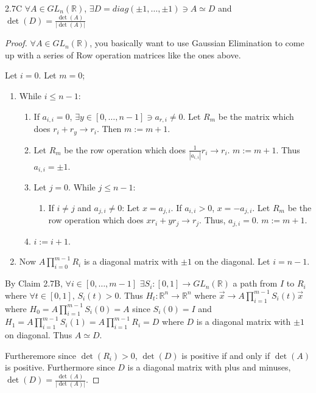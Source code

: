 \documentclass{article}
\newcommand{\R}{\mathbb{R}}
\newcommand{\abs}[1]{\left\lvert #1\right\rvert}
\begin{document}
\begin{claim}{2.7C}\label{Claim 2.7C.}
    $\forall A \in GL_n(\R)$, $\exists D = diag(\pm 1, \dots, \pm 1) \ni A \simeq D$ and $\det(D) = \frac{\det(A)}{\abs{\det(A)}}$    
\end{claim}
\begin{proof}
    $\forall A \in GL_n(\R)$, you basically want to use Gaussian Elimination to come up with a series of Row operation matrices like the ones above. 
    
    Let $i = 0$. Let $m = 0$;  
    
    \begin{enumerate}
        \item While $i \leq n - 1$:
        \begin{enumerate}
            \item If $a_{i, i} = 0$, $\exists y \in [0, \dots, n - 1] \ni a_{r, i} \neq 0$. Let $R_m$ be the matrix which does $r_{i} + r_{y} \to r_i$. Then $m := m + 1$.
            \item Let $R_m$ be the row operation which does $\frac{1}{\abs{a_{i , i}}} r_i \to r_i$. $m := m + 1$. Thus $a_{i, i} = \pm 1$.     
            \item Let $j = 0$. While $j \leq n - 1$: 
            \begin{enumerate}
                \item If $i \neq j$ and $a_{j, i} \neq 0$: Let $x = a_{j, i}$. If $a_{i, i} > 0$, $x = -a_{j, i}$. Let $R_m$ be the row operation which does $x r_i + y r_j \to r_j$. Thus, $a_{j, i} = 0$. $m := m + 1$.      
            \end{enumerate}
            
            \item $i := i + 1$.  
        \end{enumerate}
                 
        \item Now $A \prod_{i = 0}^{m - 1} R_i$ is a diagonal matrix with $\pm 1$ on the diagonal. Let $i = n - 1$. 
    \end{enumerate}
    
    By Claim 2.7B, $\forall i \in [0, \dots, m - 1]$ $\exists S_i: [0, 1] \to GL_n(\R)$ a path from $I$ to $R_i$ where $\forall t \in [0, 1]$, $S_i(t) > 0$. Thus $H_t: \R^n \to \R^n$ where $\vec{x} \to A \prod_{i = 1}^{m - 1} S_{i}(t) \vec{x}$ where $H_0 = A \prod_{i = 1}^{m - 1} S_i(0) = A$ since $S_i(0) = I$ and $H_1 = A \prod_{i = 1}^{m - 1} S_i(1) = A \prod_{i = 1}^{m - 1} R_i = D$ where $D$ is a diagonal matrix with $\pm 1$ on diagonal. Thus $A \simeq D$.
    
    Furtheremore since $\det(R_i) > 0$, $\det(D)$ is positive if and only if $\det(A)$ is positive. Furthermore since $D$ is a diagonal matrix with plus and minuses, $\det(D) = \frac{\det(A)}{\abs{\det(A)}}$.       
\end{proof}
\end{document}
